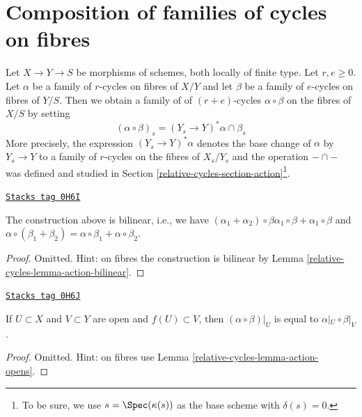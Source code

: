 \section{Composition of families of cycles on fibres}
\label{relative-cycles-section-compose-families}
Let $X \to Y \to S$ be morphisms of schemes, both locally of finite type.
Let $r, e \geq 0$. Let $\alpha$ be a family of $r$-cycles
on fibres of $X/Y$ and let $\beta$ be a family of $e$-cycles on
fibres of $Y/S$. Then we obtain a family of
of $(r + e)$-cycles $\alpha \circ \beta$ on the fibres of $X/S$
by setting
$$
(\alpha \circ \beta)_s = (Y_s \to Y)^*\alpha \cap \beta_s
$$
More precisely, the expression $(Y_s \to Y)^*\alpha$ denotes
the base change of $\alpha$ by $Y_s \to Y$ to a family of $r$-cycles
on the fibres of $X_s/Y_s$ and the operation $- \cap -$
was defined and studied in Section \ref{relative-cycles-section-action}\footnote{To be sure,
we use $s = \Spec(\kappa(s))$ as the base scheme with $\delta(s) = 0$.}.

\begin{lemma}
\label{relative-cycles-lemma-construction-bilinear}
\href{https://stacks.math.columbia.edu/tag/0H6I}{\texttt{Stacks tag 0H6I}}

The construction above is bilinear, i.e., we have
$(\alpha_1 + \alpha_2) \circ \beta \alpha_1 \circ \beta +
\alpha_1 \circ \beta$ and $\alpha \circ (\beta_1 + \beta_2) =
\alpha \circ \beta_1 + \alpha \circ \beta_2$.
\end{lemma}

\begin{proof}
Omitted. Hint: on fibres the construction is bilinear
by Lemma \ref{relative-cycles-lemma-action-bilinear}.
\end{proof}

\begin{lemma}
\label{relative-cycles-lemma-construction-opens}
\href{https://stacks.math.columbia.edu/tag/0H6J}{\texttt{Stacks tag 0H6J}}

If $U \subset X$ and $V \subset Y$ are open and $f(U) \subset V$, then
$(\alpha \circ \beta)|_U$ is equal to $\alpha|_U \circ \beta|_V$.
\end{lemma}

\begin{proof}
Omitted. Hint: on fibres use
Lemma \ref{relative-cycles-lemma-action-opens}.
\end{proof}

